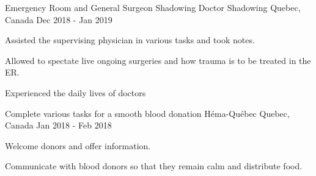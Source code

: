 
\begin{cventries}
\cventry
    {Emergency Room and General Surgeon Shadowing}
    {Doctor Shadowing}
    {Quebec, Canada}
    {Dec 2018 - Jan 2019}
    {
      \begin{cvitems}
        \item {Assisted the supervising physician in various tasks and took notes.}
        \item {Allowed to spectate live ongoing surgeries and how trauma is to be treated in the ER.}
        \item {Experienced the daily lives of doctors}
      \end{cvitems}
    }    \newline

\cventry
    {Complete various tasks for a smooth blood donation}
    {Héma-Québec}
    {Quebec, Canada}
    {Jan 2018 - Feb 2018}
    {
      \begin{cvitems}
        \item {Welcome donors and offer information.}
        \item {Communicate with blood donors so that they remain calm and distribute food.}
      \end{cvitems}
    }    \newline


\end{cventries}
